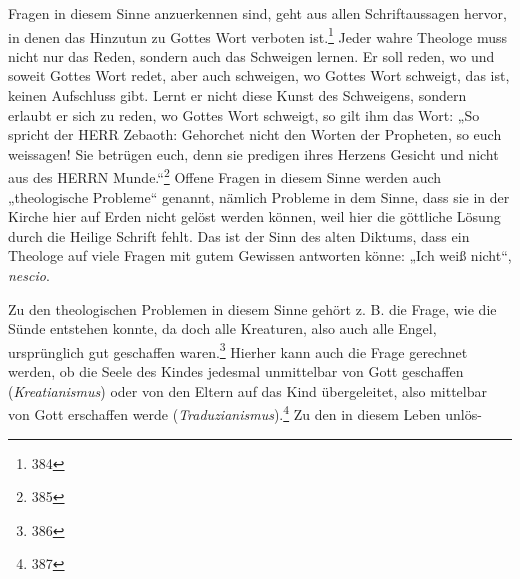 Fragen in diesem Sinne anzuerkennen sind, geht aus allen Schriftaussagen hervor, in denen das Hinzutun zu Gottes Wort verboten ist.\footnote{384} Jeder wahre Theologe muss nicht nur das Reden, sondern auch das Schweigen lernen. Er soll reden, wo und soweit Gottes Wort redet, aber auch schweigen, wo Gottes Wort schweigt, das ist, keinen Aufschluss gibt. Lernt er nicht diese Kunst des Schweigens, sondern erlaubt er sich zu reden, wo Gottes Wort schweigt, so gilt ihm das Wort: „So spricht der HERR Zebaoth: Gehorchet nicht den Worten der Propheten, so euch weissagen! Sie betrügen euch, denn sie predigen ihres Herzens Gesicht und nicht aus des HERRN Munde.“\footnote{385} Offene Fragen in diesem Sinne werden auch „theologische Probleme“ genannt, nämlich Probleme in dem Sinne, dass sie in der Kirche hier auf Erden nicht gelöst werden können, weil hier die göttliche Lösung durch die Heilige Schrift fehlt. Das ist der Sinn des alten Diktums, dass ein Theologe auf viele Fragen mit gutem Gewissen antworten könne: „Ich weiß nicht“, \emph{nescio}.\par Zu den theologischen Problemen in diesem Sinne gehört z. B. die Frage, wie die Sünde entstehen konnte, da doch alle Kreaturen, also auch alle Engel, ursprünglich gut geschaffen waren.\footnote{386} Hierher kann auch die Frage gerechnet werden, ob die Seele des Kindes jedesmal unmittelbar von Gott geschaffen (\emph{Kreatianismus}) oder von den Eltern auf das Kind übergeleitet, also mittelbar von Gott erschaffen werde (\emph{Traduzianismus}).\footnote{387} Zu den in diesem Leben unlös-